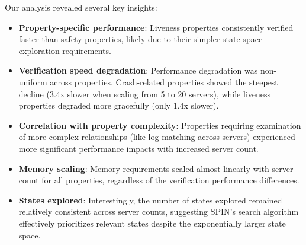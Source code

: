 \begin{table}[!htbp]
\centering
\caption{Performance Trend Analysis by Property Type}
\label{tab:performance-trends}
\end{table}

Our analysis revealed several key insights:

\begin{itemize}
    \item \textbf{Property-specific performance}: Liveness properties consistently verified faster than safety properties, likely due to their simpler state space exploration requirements.
    
    \item \textbf{Verification speed degradation}: Performance degradation was non-uniform across properties. Crash-related properties showed the steepest decline (3.4x slower when scaling from 5 to 20 servers), while liveness properties degraded more gracefully (only 1.4x slower).
    
    \item \textbf{Correlation with property complexity}: Properties requiring examination of more complex relationships (like log matching across servers) experienced more significant performance impacts with increased server count.
    
    \item \textbf{Memory scaling}: Memory requirements scaled almost linearly with server count for all properties, regardless of the verification performance differences.
    
    \item \textbf{States explored}: Interestingly, the number of states explored remained relatively consistent across server counts, suggesting SPIN's search algorithm effectively prioritizes relevant states despite the exponentially larger state space.
\end{itemize}

